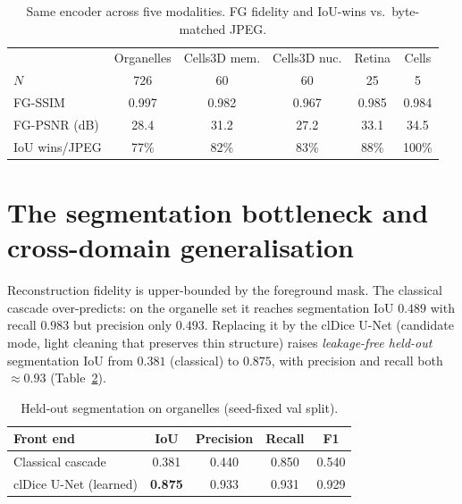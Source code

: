 \documentclass[runningheads]{llncs}
\begin{document}
\begin{table}[t]
\centering
\caption{Same encoder across five modalities. FG fidelity and IoU-wins vs.\
byte-matched JPEG.}
\label{tab:cross}
\setlength{\tabcolsep}{4pt}
\begin{tabular}{lccccc}
\toprule
 & Organelles & Cells3D mem. & Cells3D nuc. & Retina & Cells \\
$N$ & 726 & 60 & 60 & 25 & 5\\
\midrule
FG-SSIM       & 0.997 & 0.982 & 0.967 & 0.985 & 0.984\\
FG-PSNR (dB)  & 28.4  & 31.2  & 27.2  & 33.1  & 34.5\\
IoU wins/JPEG & 77\%  & 82\%  & 83\%  & 88\%  & 100\%\\
\bottomrule
\end{tabular}
\end{table}

\section{The segmentation bottleneck and cross-domain generalisation}\label{sec:seg}
Reconstruction fidelity is upper-bounded by the foreground mask. The classical
cascade over-predicts: on the organelle set it reaches segmentation IoU $0.489$
with recall $0.983$ but precision only $0.493$. Replacing it by the clDice U-Net
(candidate mode, light cleaning that preserves thin structure) raises
\emph{leakage-free held-out} segmentation IoU from $0.381$ (classical) to
$0.875$, with precision and recall both $\approx0.93$ (Table~\ref{tab:seg}).

\begin{table}[t]
\centering
\caption{Held-out segmentation on organelles (seed-fixed val split).}
\label{tab:seg}
\setlength{\tabcolsep}{7pt}
\begin{tabular}{lcccc}
\toprule
Front end & IoU & Precision & Recall & F1\\
\midrule
Classical cascade      & 0.381 & 0.440 & 0.850 & 0.540\\
clDice U-Net (learned) & \textbf{0.875} & 0.933 & 0.931 & 0.929\\
\bottomrule
\end{tabular}
\end{table}
\end{document}
